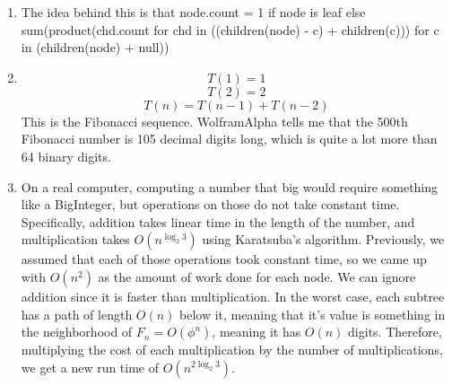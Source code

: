 \documentclass[11pt]{article}
\begin{document}
\begin{solution}
    \begin{enumerate}
        \item The idea behind this is that 
            node.count = 1 if node is leaf else sum(product(chd.count for chd in ((children(node) - {c}) + children(c))) for c in (children(node) + null))
        \item 
            \[
                T(1) = 1
            \]
            \[
            T(2) = 2
            \]
            \[
            T(n) = T(n - 1) + T(n - 2)
            \]
            This is the Fibonacci sequence. WolframAlpha tells me that the 500th Fibonacci number is 105 decimal digits long, which is quite a lot more than 64 binary digits.
        \item On a real computer, computing a number that big would require something like a BigInteger, but operations on those do not take constant time. Specifically, addition takes linear time in the length of the number, and multiplication takes $O(n^{\log_2{3}})$ using Karatsuba's algorithm. Previously, we assumed that each of those operations took constant time, so we came up with $O(n^2)$ as the amount of work done for each node. We can ignore addition since it is faster than multiplication. In the worst case, each subtree has a path of length $O(n)$ below it, meaning that it's value is something in the neighborhood of $F_n = O(\phi^n)$, meaning it has $O(n)$ digits. Therefore, multiplying the cost of each multiplication by the number of multiplications, we get a new run time of $O(n^{2\log_2{3}})$.
    \end{enumerate}
\end{solution}
\end{document}
